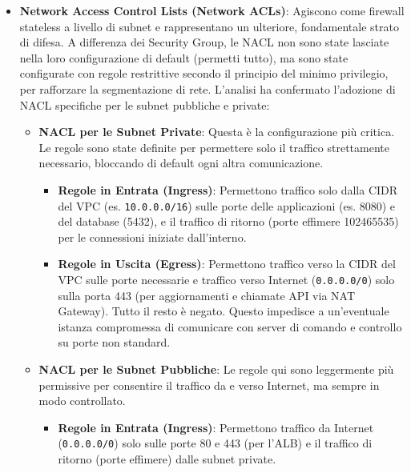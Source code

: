 \begin{itemize}
\textbf{Nota sui Placeholder:} Gli identificatori di risorse AWS utilizzati negli esempi di questa sezione (come subnet ID \texttt{subnet\discretionary{-}{}{-}0a1b2c3d}, security group ID \texttt{sg\discretionary{-}{}{-}0a1b2c3d4e5f67890}, NAT Gateway ID \texttt{nat\discretionary{-}{}{-}0123456789abcdef0}, ecc.) sono placeholder generici utilizzati per motivi di privacy aziendale. In un ambiente di produzione reale, questi identificatori rifletterebbero gli ID specifici assegnati da AWS alle risorse dell'infrastruttura di Finanz.
\item \textbf{Network Access Control Lists (Network ACLs)}: Agiscono come firewall stateless a livello di subnet e rappresentano un ulteriore, fondamentale strato di difesa. A differenza dei Security Group, le NACL non sono state lasciate nella loro configurazione di default (permetti tutto), ma sono state configurate con regole restrittive secondo il principio del minimo privilegio, per rafforzare la segmentazione di rete.
L'analisi ha confermato l'adozione di NACL specifiche per le subnet pubbliche e private:
\begin{itemize}
\item \textbf{NACL per le Subnet Private}: Questa è la configurazione più critica. Le regole sono state definite per permettere solo il traffico strettamente necessario, bloccando di default ogni altra comunicazione.
\begin{itemize}
\item \textbf{Regole in Entrata (Ingress)}: Permettono traffico solo dalla CIDR del VPC (es. \texttt{10.0.0.0/16}) sulle porte delle applicazioni (es. 8080) e del database (5432), e il traffico di ritorno (porte effimere 1024\discretionary{-}{}{-}65535) per le connessioni iniziate dall'interno.
\item \textbf{Regole in Uscita (Egress)}: Permettono traffico verso la CIDR del VPC sulle porte necessarie e traffico verso Internet (\texttt{0.0.0.0/0}) solo sulla porta 443 (per aggiornamenti e chiamate API via NAT Gateway). Tutto il resto è negato. Questo impedisce a un'eventuale istanza compromessa di comunicare con server di comando e controllo su porte non standard.
\end{itemize}
\item \textbf{NACL per le Subnet Pubbliche}: Le regole qui sono leggermente più permissive per consentire il traffico da e verso Internet, ma sempre in modo controllato.
\begin{itemize}
\item \textbf{Regole in Entrata (Ingress)}: Permettono traffico da Internet (\texttt{0.0.0.0/0}) solo sulle porte 80 e 443 (per l'ALB) e il traffico di ritorno (porte effimere) dalle subnet private.

\end{itemize}
\end{itemize}
\end{itemize}
